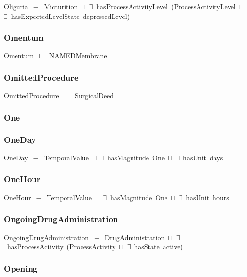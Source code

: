 \documentclass{article}
\begin{document}
Oliguria~\ensuremath{\equiv}~Micturition~\ensuremath{\sqcap}~\ensuremath{\exists}~hasProcessActivityLevel~(ProcessActivityLevel~\ensuremath{\sqcap}~\ensuremath{\exists}~hasExpectedLevelState~depressedLevel)

\subsubsection*{Omentum}

Omentum~\ensuremath{\sqsubseteq}~NAMEDMembrane~

\subsubsection*{OmittedProcedure}

OmittedProcedure~\ensuremath{\sqsubseteq}~SurgicalDeed~

\subsubsection*{One}

\subsubsection*{OneDay}

OneDay~\ensuremath{\equiv}~TemporalValue~\ensuremath{\sqcap}~\ensuremath{\exists}~hasMagnitude~One~\ensuremath{\sqcap}~\ensuremath{\exists}~hasUnit~days

\subsubsection*{OneHour}

OneHour~\ensuremath{\equiv}~TemporalValue~\ensuremath{\sqcap}~\ensuremath{\exists}~hasMagnitude~One~\ensuremath{\sqcap}~\ensuremath{\exists}~hasUnit~hours

\subsubsection*{OngoingDrugAdministration}

OngoingDrugAdministration~\ensuremath{\equiv}~DrugAdministration~\ensuremath{\sqcap}~\ensuremath{\exists}~hasProcessActivity~(ProcessActivity~\ensuremath{\sqcap}~\ensuremath{\exists}~hasState~active)

\subsubsection*{Opening}
\end{document}
